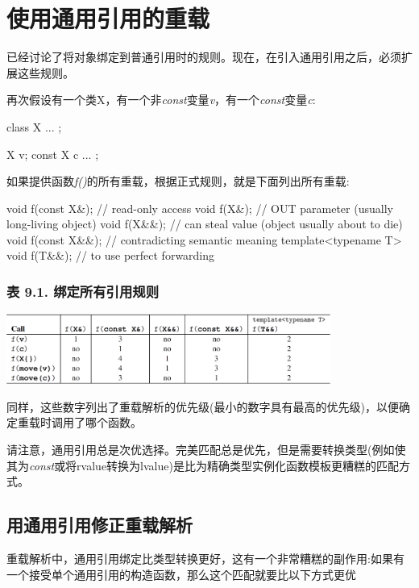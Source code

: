 \section{使用通用引用的重载}
已经讨论了将对象绑定到普通引用时的规则。现在，在引入通用引用之后，必须扩展这些规则。

再次假设有一个类X，有一个非\textit{const}变量\textit{v}，有一个\textit{const}变量\textit{c}:

\begin{cppcode}
class X {
	...
};

X v;
const X c{ ... };
\end{cppcode}

如果提供函数\textit{f()}的所有重载，根据正式规则，就是下面列出所有重载:

\begin{cppcode}
void f(const X&); // read-only access
void f(X&); // OUT parameter (usually long-living object)
void f(X&&); // can steal value (object usually about to die)
void f(const X&&); // contradicting semantic meaning
template<typename T>
void f(T&&); // to use perfect forwarding
\end{cppcode}

\subsubsection{表 9.1. 绑定所有引用规则}
\begin{center}
	\includegraphics[width=0.8\textwidth]{part2/ch9/images/1}
\end{center}

同样，这些数字列出了重载解析的优先级(最小的数字具有最高的优先级)，以便确定重载时调用了哪个函数。

请注意，通用引用总是次优选择。完美匹配总是优先，但是需要转换类型(例如使其为\textit{const}或将rvalue转换为lvalue)是比为精确类型实例化函数模板更糟糕的匹配方式。

\subsection{用通用引用修正重载解析}

重载解析中，通用引用绑定比类型转换更好，这有一个非常糟糕的副作用:如果有一个接受单个通用引用的构造函数，那么这个匹配就要比以下方式更优

